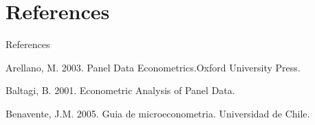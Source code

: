 \section{References}

\begin{frame}{References}
	\begin{thebibliography}{00}
		\beamertemplatebookbibitems
		Arellano, M. 2003. Panel Data Econometrics.Oxford University
		Press.
		
		\beamertemplatebookbibitems
		Baltagi, B. 2001. Econometric Analysis of Panel Data.
		
		\beamertemplatebookbibitems
		Benavente, J.M. 2005. Guia de microeconometria. Universidad
		de Chile.
	\end{thebibliography}
\end{frame}